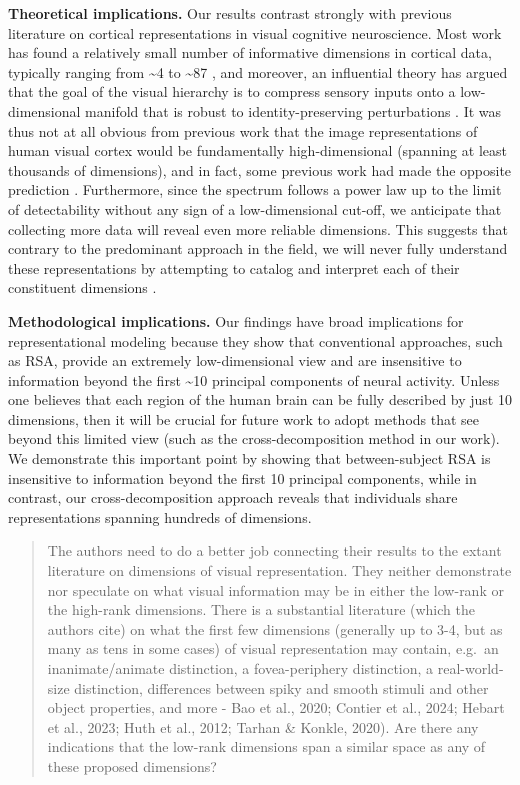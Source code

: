 \documentclass[10pt]{article}
\begin{document}
\textbf{Theoretical implications.} Our results contrast strongly with previous literature on cortical representations in visual cognitive neuroscience. Most work has found a relatively small number of informative dimensions in cortical data, typically ranging from \textasciitilde4 to \textasciitilde87 \autocite{Huth2012,Lehky2014,Khosla2022,Tarhan2020,Hebart2023}, and moreover, an influential theory has argued that the goal of the visual hierarchy is to compress sensory inputs onto a low-dimensional manifold that is robust to identity-preserving perturbations \autocite{Fusi2016,Lehky2014,Lehky2016}. It was thus not at all obvious from previous work that the image representations of human visual cortex would be fundamentally high-dimensional (spanning at least thousands of dimensions), and in fact, some previous work had made the opposite prediction \autocite{Lehky2016}. Furthermore, since the spectrum follows a power law up to the limit of detectability without any sign of a low-dimensional cut-off, we anticipate that collecting more data will reveal even more reliable dimensions. This suggests that contrary to the predominant approach in the field, we will never fully understand these representations by attempting to catalog and interpret each of their constituent dimensions \autocite{Hebart2023,Khosla2022}.

\textbf{Methodological implications.} Our findings have broad implications for representational modeling because they show that conventional approaches, such as RSA, provide an extremely low-dimensional view and are insensitive to information beyond the first \textasciitilde10 principal components of neural activity. Unless one believes that each region of the human brain can be fully described by just 10 dimensions, then it will be crucial for future work to adopt methods that see beyond this limited view (such as the cross-decomposition method in our work). We demonstrate this important point by showing that between-subject RSA is insensitive to information beyond the first 10 principal components, while in contrast, our cross-decomposition approach reveals that individuals share representations spanning hundreds of dimensions.

\begin{quote}
The authors need to do a better job connecting their results to the extant literature on dimensions of visual representation. They neither demonstrate nor speculate on what visual information may be in either the low-rank or the high-rank dimensions. There is a substantial literature (which the authors cite) on what the first few dimensions (generally up to 3-4, but as many as tens in some cases) of visual representation may contain, e.g.~an inanimate/animate distinction, a fovea-periphery distinction, a real-world-size distinction, differences between spiky and smooth stimuli and other object properties, and more - Bao et al., 2020; Contier et al., 2024; Hebart et al., 2023; Huth et al., 2012; Tarhan \& Konkle, 2020). Are there any indications that the low-rank dimensions span a similar space as any of these proposed dimensions?
\end{quote}
\end{document}
